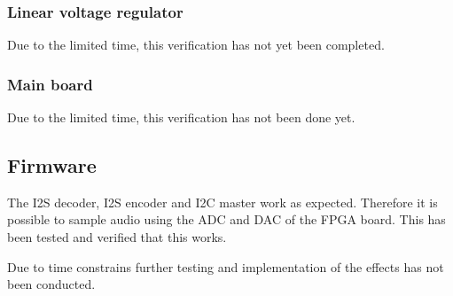 \subsubsection{Linear voltage regulator}
Due to the limited time, this verification has not yet been completed.

\subsubsection{Main board}
Due to the limited time, this verification has not been done yet.

\subsection{Firmware}
The I2S decoder, I2S encoder and I2C master work as expected. Therefore it is possible to sample audio using the ADC and DAC of the FPGA board. This has been tested and verified that this works. 

Due to time constrains further testing and implementation of the effects has not been conducted. 
